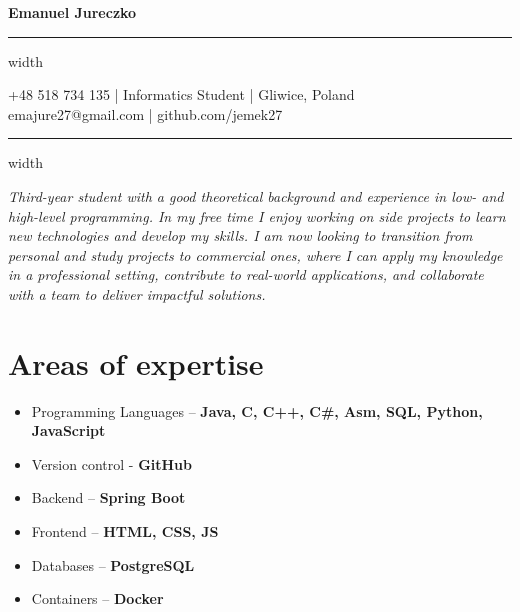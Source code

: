 \documentclass[11pt,letterpaper]{article}
\newcommand{\name}[1]{
  \begin{center}
    \Huge\textbf{#1}
  \end{center}
  \vspace{-0.5em}
  \hrule height 0.4pt width \textwidth
  \vspace{0.5em}
}
\newcommand{\contact}[5]{
  \begin{center}
    #1 | #2 | #3 \\
    #4 | #5
  \end{center}
  \vspace{-0.5em}
  \hrule height 0.4pt width \textwidth
  \vspace{0.5em}
}
\newcommand{\spacedSection}[1]{
  \vspace{0.1em}
  \section{#1}
  \vspace{1em}
}
\begin{document}
\name{Emanuel Jureczko}
\vspace{-0.5em}
\contact{+48 518 734 135}{Informatics Student}{Gliwice, Poland}{emajure27@gmail.com}{github.com/jemek27}

\vspace{-0.5em}
\begin{justify}
\textit{Third-year student with a good theoretical background and experience in low- and high-level programming.
In my free time I enjoy working on side projects to learn new technologies and develop my skills.
I am now looking to transition from personal and study projects to commercial ones, where I can apply my knowledge 
in a professional setting, contribute to real-world applications, and collaborate with a team to deliver impactful 
solutions.}
\end{justify}

\spacedSection{Areas of expertise}

\begin{minipage}[t]{0.33\textwidth}
  \begin{flushleft}
      \begin{itemize}[leftmargin=0.5cm]
          \setlength\itemsep{0.4em}
          \item Programming Languages – \textbf{Java, C, C++, C\#, Asm, SQL, Python, JavaScript}
          \item Version control - \textbf{GitHub}
      \end{itemize}
  \end{flushleft}
\end{minipage}
\begin{minipage}[t]{0.33\textwidth}
  \begin{flushleft}
      \begin{itemize}[leftmargin=0.5cm]
          \setlength\itemsep{0.4em}
          \item Backend – \textbf{Spring Boot}
          \item Frontend – \textbf{HTML, CSS, JS}
      \end{itemize}
  \end{flushleft}
\end{minipage}
\begin{minipage}[t]{0.33\textwidth}
  \begin{flushleft}
      \begin{itemize}[leftmargin=0.5cm]
          \setlength\itemsep{0.4em}
          \item Databases – \textbf{PostgreSQL}
          \item Containers – \textbf{Docker}
      \end{itemize}
  \end{flushleft}
\end{minipage}
\end{document}
